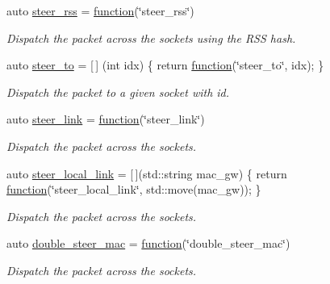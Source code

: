 \begin{DoxyCompactItemize}
auto \hyperlink{namespacepfq_1_1lang_1_1anonymous__namespace_02default_8hpp_03_ae5f71a205afe1a8e3ed959d4c555fcb9}{steer\+\_\+rss} = \hyperlink{namespacepfq_1_1lang_a1a4638059d700ae08d0ca63886ff2bb3}{function}(\char`\"{}steer\+\_\+rss\char`\"{})
\begin{DoxyCompactList}\small\item\em Dispatch the packet across the sockets using the R\+SS hash. \end{DoxyCompactList}\item 
auto \hyperlink{namespacepfq_1_1lang_1_1anonymous__namespace_02default_8hpp_03_a4980fea0af16a26df90f252b5ae21113}{steer\+\_\+to} = \mbox{[}$\,$\mbox{]} (int idx) \{ return \hyperlink{namespacepfq_1_1lang_a1a4638059d700ae08d0ca63886ff2bb3}{function}(\char`\"{}steer\+\_\+to\char`\"{}, idx); \}
\begin{DoxyCompactList}\small\item\em Dispatch the packet to a given socket with id. \end{DoxyCompactList}\item 
auto \hyperlink{namespacepfq_1_1lang_1_1anonymous__namespace_02default_8hpp_03_ac1f3f9a2caf886a1441e62860a4ca058}{steer\+\_\+link} = \hyperlink{namespacepfq_1_1lang_a1a4638059d700ae08d0ca63886ff2bb3}{function}(\char`\"{}steer\+\_\+link\char`\"{})
\begin{DoxyCompactList}\small\item\em Dispatch the packet across the sockets. \end{DoxyCompactList}\item 
auto \hyperlink{namespacepfq_1_1lang_1_1anonymous__namespace_02default_8hpp_03_a6344b2b22c9e20a2015452ad2c1002f7}{steer\+\_\+local\+\_\+link} = \mbox{[}$\,$\mbox{]}(std\+::string mac\+\_\+gw) \{ return \hyperlink{namespacepfq_1_1lang_a1a4638059d700ae08d0ca63886ff2bb3}{function}(\char`\"{}steer\+\_\+local\+\_\+link\char`\"{}, std\+::move(mac\+\_\+gw)); \}
\begin{DoxyCompactList}\small\item\em Dispatch the packet across the sockets. \end{DoxyCompactList}\item 
auto \hyperlink{namespacepfq_1_1lang_1_1anonymous__namespace_02default_8hpp_03_a122b03580c609d71ca622ef9b15fa78d}{double\+\_\+steer\+\_\+mac} = \hyperlink{namespacepfq_1_1lang_a1a4638059d700ae08d0ca63886ff2bb3}{function}(\char`\"{}double\+\_\+steer\+\_\+mac\char`\"{})
\begin{DoxyCompactList}\small\item\em Dispatch the packet across the sockets. \end{DoxyCompactList}\item 

\end{DoxyCompactItemize}
